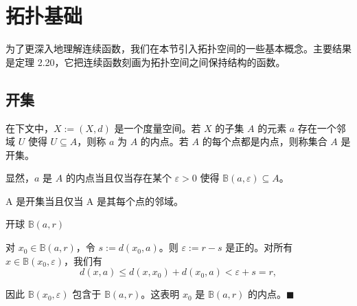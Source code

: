 \section{拓扑基础}

为了更深入地理解连续函数，我们在本节引入拓扑空间的一些基本概念。主要结果是定理 2.20，它把连续函数刻画为拓扑空间之间保持结构的函数。

\subsection*{开集}

在下文中，$X := (X, d)$ 是一个度量空间。若 $X$ 的子集 $A$ 的元素 $a$ 存在一个邻域 $U$ 使得 $U \subseteq A$，则称 $a$ 为 $A$ 的内点。若 $A$ 的每个点都是内点，则称集合 $A$ 是开集。

\begin{remark}

\begin{items}
\item

显然，$ a $ 是 $ A $ 的内点当且仅当存在某个 $ \varepsilon > 0 $ 使得 $ \mathbb{B}(a, \varepsilon) \subseteq A $。

\item

A 是开集当且仅当 A 是其每个点的邻域。

\end{items}

\end{remark}

\begin{example}

开球 $ \mathbb{B}(a, r) $

\proofhead
对 $x_0 \in \mathbb{B}(a, r)$，令 $s := d(x_0, a)$。则 $\varepsilon := r - s$ 是正的。对所有 $x \in \mathbb{B}(x_0, \varepsilon)$，我们有
\[
d(x,a)\leq d(x,x_{0})+d(x_{0},a)<\varepsilon+s=r,
\]

因此 $\mathbb{B}(x_0,\varepsilon)$ 包含于 $\mathbb{B}(a,r)$。这表明 $x_0$ 是 $\mathbb{B}(a,r)$ 的内点。$\blacksquare$

\end{example}

